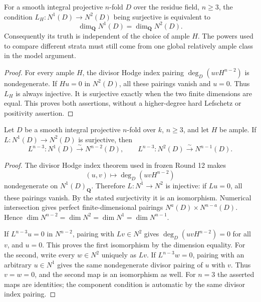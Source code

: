 \begin{lemma}
\label{r15model:rank-condition}
For a smooth integral projective $n$-fold $D$ over the residue
field, $n\geq3$, the condition $L_H:N^1(D)\to N^2(D)$ being
surjective is equivalent to
\[
                 \dim_{\mathbf Q}N^1(D)=\dim_{\mathbf Q}N^2(D).
\]
Consequently its truth is independent of the choice of ample $H$.
The powers used to compare different strata must still come from
one global relatively ample class in the model argument.
\end{lemma}

\begin{proof}
For every ample $H$, the divisor Hodge index pairing
$\deg_D(u vH^{n-2})$ is nondegenerate.  If $H u=0$ in $N^2(D)$,
all these pairings vanish and $u=0$.  Thus $L_H$ is always
injective.  It is surjective exactly when the two finite dimensions
are equal.  This proves both assertions, without a higher-degree
hard Lefschetz or positivity assertion.
\end{proof}

\begin{lemma}
\label{r15model:lefschetz}
Let $D$ be a smooth integral projective $n$-fold over $k$, $n\geq3$,
and let $H$ be ample.  If $L:N^1(D)\to N^2(D)$ is surjective, then
\[
 L^{n-3}:N^1(D)\xrightarrow{\sim}N^{n-2}(D),\qquad
 L^{n-3}:N^2(D)\xrightarrow{\sim}N^{n-1}(D).
\tag{LW15.3}\label{r15model:two-isomorphisms}
\]
\end{lemma}

\begin{proof}
The divisor Hodge index theorem used in frozen Round 12 makes
\[
 (u,v)\longmapsto\deg_D(u v H^{n-2})
\]
nondegenerate on $N^1(D)_{\mathbf Q}$.  Therefore $L:N^1\to N^2$
is injective: if $Lu=0$, all these pairings vanish.  By the stated
surjectivity it is an isomorphism.  Numerical intersection gives
perfect finite-dimensional pairings $N^a(D)\times N^{n-a}(D)$.
Hence $\dim N^{n-2}=\dim N^2=\dim N^1=\dim N^{n-1}$.

If $L^{n-3}u=0$ in $N^{n-2}$, pairing with $Lv\in N^2$ gives
$\deg_D(u v H^{n-2})=0$ for all $v$, and $u=0$.
This proves the first isomorphism by the dimension equality.
For the second, write every $w\in N^2$ uniquely as $Lv$.
If $L^{n-3}w=0$, pairing with an arbitrary $u\in N^1$ gives
the same nondegenerate divisor pairing of $u$ with $v$.
Thus $v=w=0$, and the second map is an isomorphism as well.
For $n=3$ the asserted maps are identities; the component
condition is automatic by the same divisor index pairing.
\end{proof}

